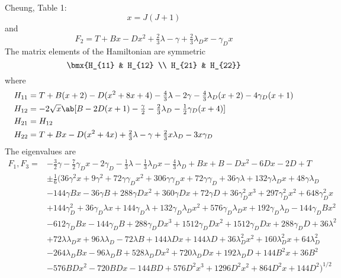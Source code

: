 \documentclass[11pt, twoside, fleqn]{report}
\begin{document}
Cheung, Table 1:
\begin{equation*}
    x = J(J + 1)
\end{equation*}
and
\begin{equation*}
    F_2 = T + Bx - Dx^2 + \tfrac{2}{3}\lambda - \gamma + \tfrac{2}{3}\lambda_Dx - \gamma_Dx
\end{equation*}
The matrix elements of the Hamiltonian are symmetric
\begin{equation*}
    \bmx{H_{11} & H_{12} \\ H_{21} & H_{22}}
\end{equation*}
where
\begin{align*}
    H_{11} & = T + B(x + 2) - D(x^2 + 8x + 4) - \tfrac{4}{3}\lambda - 2\gamma - \tfrac{4}{3}\lambda_D(x + 2) - 4\gamma_D(x + 1) \\
    H_{12} & = -2\sqrt{x}\ab[B - 2D(x + 1) - \tfrac{\gamma}{2} - \tfrac{2}{3}\lambda_D - \tfrac{1}{2}\gamma_D(x + 4)]           \\
    H_{21} & = H_{12}                                                                                                           \\
    H_{22} & = T + Bx - D(x^2 + 4x) + \tfrac{2}{3}\lambda - \gamma + \tfrac{2}{3}x\lambda_D - 3x\gamma_D
\end{align*}
The eigenvalues are
\begin{align*}
    F_1, F_3 = & -\tfrac{3}{2}\gamma - \tfrac{7}{2}\gamma_D x - 2 \gamma_D - \tfrac{1}{3}\lambda - \tfrac{1}{3}\lambda_D x - \tfrac{4}{3}\lambda_D + B x + B - D x^2 - 6 D x - 2 D + T                     \\
               & \pm \tfrac{1}{6}\bigl(36 \gamma^2 x + 9 \gamma^2 + 72 \gamma \gamma_D x^2 + 306 \gamma \gamma_D x + 72 \gamma \gamma_D + 36 \gamma \lambda + 132 \gamma \lambda_D x + 48 \gamma \lambda_D \\
               & - 144 \gamma B x - 36 \gamma B + 288 \gamma D x^2 + 360 \gamma D x + 72 \gamma D + 36 \gamma_D^2 x^{3} + 297 \gamma_D^2 x^2 + 648 \gamma_D^2 x                                            \\
               & + 144 \gamma_D^2 + 36 \gamma_D \lambda x + 144 \gamma_D \lambda + 132 \gamma_D \lambda_D x^2 + 576 \gamma_D \lambda_D x + 192 \gamma_D \lambda_D - 144 \gamma_D B x^2                     \\
               & - 612 \gamma_D B x - 144 \gamma_D B + 288 \gamma_D D x^{3} + 1512 \gamma_D D x^2 + 1512 \gamma_D D x + 288 \gamma_D D + 36 \lambda^2                                                      \\
               & + 72 \lambda \lambda_D x + 96 \lambda \lambda_D - 72 \lambda B + 144 \lambda D x + 144 \lambda D + 36 \lambda_D^2 x^2 + 160 \lambda_D^2 x + 64 \lambda_D^2                                \\
               & - 264 \lambda_D B x - 96 \lambda_D B + 528 \lambda_D D x^2 + 720 \lambda_D D x + 192 \lambda_D D + 144 B^2 x + 36 B^2                                                                     \\
               & - 576 B D x^2 - 720 B D x - 144 B D + 576 D^2 x^{3} + 1296 D^2 x^2 + 864 D^2 x + 144 D^2\bigr)^{1/2}
\end{align*}
\end{document}

